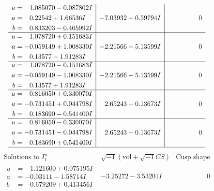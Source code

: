 \documentclass[1p]{elsarticle_modified}
\theoremstyle{definition}
\newcommand{\I}{\sqrt{-1}}
\begin{document}
$$\begin{array}{c|c|c}
\begin{aligned}
u &= \phantom{-}1.085070 - 0.087802 I \\
a &= \phantom{-}0.22542 + 1.66536 I \\
b &= \phantom{-}0.833203 - 0.405992 I\end{aligned}
 & -7.03932 + 0.59794 I & \phantom{-0.000000 } 0 \\ \hline\begin{aligned}
u &= \phantom{-}1.078720 + 0.151683 I \\
a &= -0.059149 + 1.008330 I \\
b &= \phantom{-}0.13577 - 1.91283 I\end{aligned}
 & -2.21566 - 5.13599 I & \phantom{-0.000000 } 0 \\ \hline\begin{aligned}
u &= \phantom{-}1.078720 - 0.151683 I \\
a &= -0.059149 - 1.008330 I \\
b &= \phantom{-}0.13577 + 1.91283 I\end{aligned}
 & -2.21566 + 5.13599 I & \phantom{-0.000000 } 0 \\ \hline\begin{aligned}
u &= \phantom{-}0.816050 + 0.330070 I \\
a &= -0.731451 + 0.044798 I \\
b &= \phantom{-}0.183690 - 0.541400 I\end{aligned}
 & \phantom{-}2.65243 + 0.13673 I & \phantom{-0.000000 } 0 \\ \hline\begin{aligned}
u &= \phantom{-}0.816050 - 0.330070 I \\
a &= -0.731451 - 0.044798 I \\
b &= \phantom{-}0.183690 + 0.541400 I\end{aligned}
 & \phantom{-}2.65243 - 0.13673 I & \phantom{-0.000000 } 0\\
 \hline 
 \end{array}$$\newpage$$\begin{array}{c|c|c}  
\text{Solutions to }I^u_{1}& \I (\text{vol} + \sqrt{-1}CS) & \text{Cusp shape}\\
 \hline 
\begin{aligned}
u &= -1.121600 + 0.075195 I \\
a &= -0.03111 - 1.58714 I \\
b &= -0.679209 + 0.413456 I\end{aligned}
 & -3.25272 - 3.53201 I & \phantom{-0.000000 } 0 \\ \hline\begin{aligned}

\end{aligned}
\end{array}$$
\end{document}
